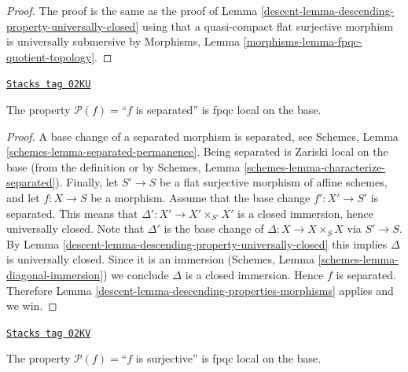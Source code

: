 \begin{proof}

The proof is the same as the proof of
Lemma \ref{descent-lemma-descending-property-universally-closed}
using that a quasi-compact flat surjective morphism is
universally submersive by
Morphisms, Lemma \ref{morphisms-lemma-fpqc-quotient-topology}.
\end{proof}

\begin{lemma}
\label{descent-lemma-descending-property-separated}
\href{https://stacks.math.columbia.edu/tag/02KU}{\texttt{Stacks tag 02KU}}

The property $\mathcal{P}(f) =$``$f$ is separated''
is fpqc local on the base.
\end{lemma}

\begin{proof}

A base change of a separated morphism is separated, see
Schemes, Lemma \ref{schemes-lemma-separated-permanence}.
Being separated is Zariski local on the base (from the
definition or by
Schemes, Lemma \ref{schemes-lemma-characterize-separated}).
Finally, let
$S' \to S$ be a flat surjective morphism of affine schemes,
and let $f : X \to S$ be a morphism. Assume that the base change
$f' : X' \to S'$ is separated. This means that
$\Delta' : X' \to X'\times_{S'} X'$ is a closed immersion,
hence universally closed.
Note that $\Delta'$ is the base change of $\Delta : X \to X \times_S X$
via $S' \to S$. By Lemma \ref{descent-lemma-descending-property-universally-closed}
this implies $\Delta$ is universally closed. Since it is
an immersion
(Schemes, Lemma \ref{schemes-lemma-diagonal-immersion})
we conclude $\Delta$ is a closed immersion.
Hence $f$ is separated.
Therefore Lemma \ref{descent-lemma-descending-properties-morphisms} applies and we win.
\end{proof}

\begin{lemma}
\label{descent-lemma-descending-property-surjective}
\href{https://stacks.math.columbia.edu/tag/02KV}{\texttt{Stacks tag 02KV}}

The property $\mathcal{P}(f) =$``$f$ is surjective''
is fpqc local on the base.
\end{lemma}

